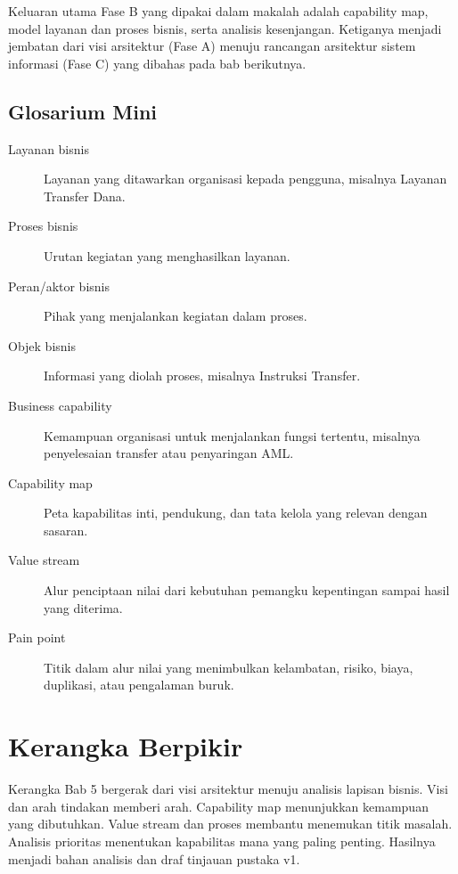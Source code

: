 Keluaran utama Fase B yang dipakai dalam makalah adalah capability map, model
layanan dan proses bisnis, serta analisis kesenjangan. Ketiganya menjadi jembatan
dari visi arsitektur (Fase A) menuju rancangan arsitektur sistem informasi
(Fase C) yang dibahas pada bab berikutnya.

\subsection*{Glosarium Mini}

\begin{description}
  \item[Layanan bisnis] Layanan yang ditawarkan organisasi kepada pengguna,
        misalnya Layanan Transfer Dana.
  \item[Proses bisnis] Urutan kegiatan yang menghasilkan layanan.
  \item[Peran/aktor bisnis] Pihak yang menjalankan kegiatan dalam proses.
  \item[Objek bisnis] Informasi yang diolah proses, misalnya Instruksi Transfer.
  \item[Business capability] Kemampuan organisasi untuk menjalankan fungsi
        tertentu, misalnya penyelesaian transfer atau penyaringan AML.
  \item[Capability map] Peta kapabilitas inti, pendukung, dan tata kelola yang
        relevan dengan sasaran.
  \item[Value stream] Alur penciptaan nilai dari kebutuhan pemangku kepentingan
        sampai hasil yang diterima.
  \item[Pain point] Titik dalam alur nilai yang menimbulkan kelambatan, risiko,
        biaya, duplikasi, atau pengalaman buruk.
\end{description}

\section{Kerangka Berpikir}

Kerangka Bab 5 bergerak dari visi arsitektur menuju analisis lapisan bisnis.
Visi dan arah tindakan memberi arah. Capability map menunjukkan kemampuan yang
dibutuhkan. Value stream dan proses membantu menemukan titik masalah. Analisis
prioritas menentukan kapabilitas mana yang paling penting. Hasilnya menjadi
bahan analisis dan draf tinjauan pustaka v1.

